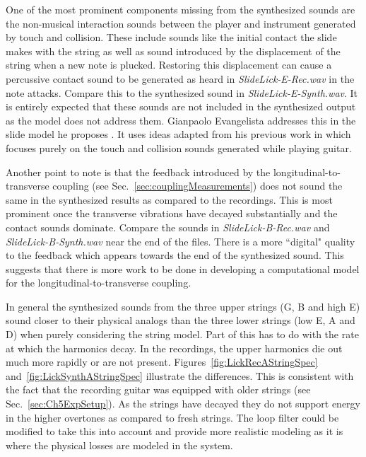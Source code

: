 \documentclass[../main.tex]{subfiles}
\begin{document}
One of the most prominent components missing from the synthesized sounds are the non-musical interaction sounds between the player and instrument generated by touch and collision. These include sounds like the initial contact the slide makes with the string as well as sound introduced by the displacement of the string when a new note is plucked. Restoring this displacement can cause a percussive contact sound to be generated as heard in \emph{SlideLick-E-Rec.wav} in the note attacks. Compare this to the synthesized sound in \emph{SlideLick-E-Synth.wav}. It is entirely expected that these sounds are not included in the synthesized output as the model does not address them. Gianpaolo Evangelista addresses this in the slide model he proposes . It uses ideas adapted from his previous work in  which focuses purely on the touch and collision sounds generated while playing guitar.

Another point to note is that the feedback introduced by the longitudinal-to-transverse coupling (see Sec.~\ref{sec:couplingMeasurements}) does not sound the same in the synthesized results as compared to the recordings. This is most prominent once the transverse vibrations have decayed substantially and the contact sounds dominate. Compare the sounds in \emph{SlideLick-B-Rec.wav} and \emph{SlideLick-B-Synth.wav} near the end of the files. There is a more ``digital" quality to the feedback which appears towards the end of the synthesized sound. This suggests that there is more work to be done in developing a computational model for the longitudinal-to-transverse coupling.

In general the synthesized sounds from the three upper strings (G, B and high E) sound closer to their physical analogs than the three lower strings (low E, A and D) when purely considering the string model. Part of this has to do with the rate at which the harmonics decay. In the recordings, the upper harmonics die out much more rapidly or are not present. Figures~\ref{fig:LickRecAStringSpec} and~\ref{fig:LickSynthAStringSpec} illustrate the differences. This is consistent with the fact that the recording guitar was equipped with older strings (see Sec.~\ref{sec:Ch5ExpSetup}). As the strings have decayed they do not support energy in the higher overtones as compared to fresh strings. The loop filter could be modified to take this into account and provide more realistic modeling as it is where the physical losses are modeled in the system.
\end{document}
